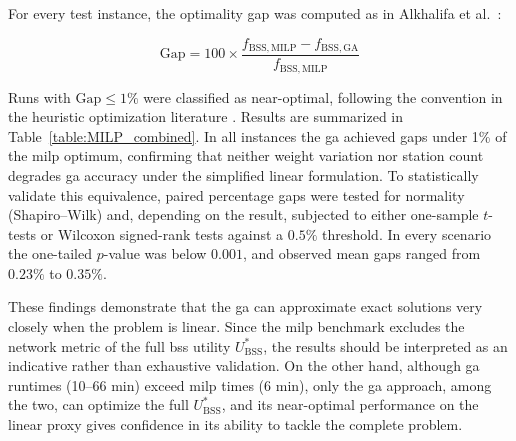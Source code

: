         For every test instance, the optimality gap was computed as in Alkhalifa et al.~\cite{Alkhalifa2025}:

        \[
        \mathrm{Gap} = 100\times\frac{f_{\mathrm{BSS,MILP}} - f_{\mathrm{BSS,GA}}}{f_{\mathrm{BSS,MILP}}}
        \]

        Runs with $\mathrm{Gap}\leq1\%$ were classified as near-optimal, following the convention in the heuristic optimization literature \cite{Lagos2023, Madadi2024, Pisinger2007}. Results are summarized in Table~\ref{table:MILP_combined}. In all instances the \ac{ga} achieved gaps under 1\% of the \ac{milp} optimum, confirming that neither weight variation nor station count degrades \ac{ga} accuracy under the simplified linear formulation. To statistically validate this equivalence, paired percentage gaps were tested for normality (Shapiro--Wilk) and, depending on the result, subjected to either one-sample $t$-tests or Wilcoxon signed-rank tests against a $0.5\%$ threshold. In every scenario the one-tailed $p$-value was below $0.001$, and observed mean gaps ranged from $0.23\%$ to $0.35\%$. 

        These findings demonstrate that the \ac{ga} can approximate exact solutions very closely when the problem is linear. Since the \ac{milp} benchmark excludes the network metric of the full \ac{bss} utility $U^*_{\mathrm{BSS}}$, the results should be interpreted as an indicative rather than exhaustive validation. On the other hand, although \ac{ga} runtimes (10–66 min) exceed \ac{milp} times (6 min), only the \ac{ga} approach, among the two, can optimize the full $U^*_{\mathrm{BSS}}$, and its near-optimal performance on the linear proxy gives confidence in its ability to tackle the complete problem.


